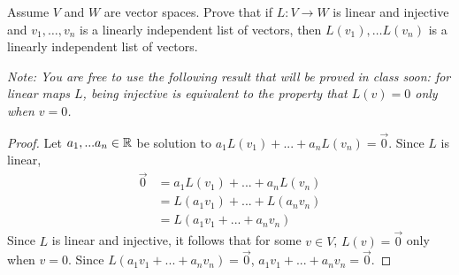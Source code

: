 \begin{question}
	\normalfont
	
Assume $V$ and $W$ are vector spaces. Prove that if $L:V\to W$ is linear and injective and \hspace{.1cm} $v_1,\dots, v_n$ \hspace{.1cm} is a linearly independent list of vectors, then \hspace{.1cm} $L(v_1),\dots L(v_n)$  \hspace{.1cm} is a linearly independent list of vectors.
	
	
\noindent \emph{Note: You are free to use the following result that will be proved in class soon: for linear maps $L$, being injective is equivalent to the property that $L(v)=0$ only when $v=0$.}

\end{question}

\begin{proof}
    Let $a_1,...a_n\in\mathbb R$ be solution to $a_1L(v_1)+...+a_nL(v_n)=\vec{0}$. Since $L$ is linear, 
    \[
        \begin{aligned}
            \vec{0} &= a_1L(v_1)+...+a_nL(v_n)\\
                    &= L(a_1v_1)+...+L(a_nv_n)\\
                    &= L(a_1v_1+...+a_nv_n)
        \end{aligned}
    \]
    Since $L$ is linear and injective, it follows that for some $v\in V$, $L(v)=\vec{0}$ only when $v=0$. Since $L(a_1v_1+...+a_nv_n)=\vec{0}$, $a_1v_1+...+a_nv_n=\vec{0}$. 
\end{proof}